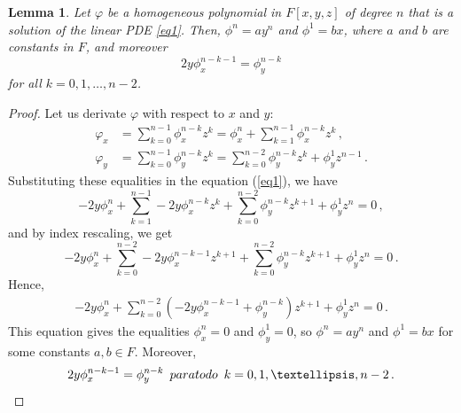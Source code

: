 \documentclass{amsart}
\newtheorem{lem}{Lemma}
\begin{document}
\begin{lem}\label{psedp}
	Let $\varphi$ be a homogeneous polynomial in $F[x,y,z]$ of degree $n$ that is a solution of the linear PDE \eqref{eq1}. Then, $\phi^{n}=ay^{n}$ and $\phi^{1}=bx$, where $a$ and $b$ are constants in $F$, and moreover
	$$2y\phi^{n-k-1}_x=\phi^{n-k}_y$$
	for all $k=0,1,\dots, n-2$.
\end{lem}
\begin{proof}
	Let us derivate $\varphi$ with respect to $x$ and  $y$:
	\begin{align*}
		\varphi_x&=\sum_{k=0}^{n-1}\phi^{n-k}_xz^k=\phi_x^{n}+\sum_{k=1}^{n-1}\phi^{n-k}_xz^k\,,\\
		\varphi_y&=\sum_{k=0}^{n-1}\phi^{n-k}_yz^k=\sum_{k=0}^{n-2}\phi^{n-k}_yz^k+\phi^1_y z^{n-1}\,.
	\end{align*}
	Substituting these equalities in the equation (\ref{eq1}), we have
	$$
	-2y\phi_x^{n}+\sum_{k=1}^{n-1}-2y\phi^{n-k}_xz^k+\sum_{k=0}^{n-2}\phi^{n-k}_yz^{k+1}+\phi^1_y z^{n}=0\,,$$
	and by index rescaling, we get
	$$
	-2y\phi_x^{n}+\sum_{k=0}^{n-2}-2y\phi^{n-k-1}_xz^{k+1}+\sum_{k=0}^{n-2}\phi^{n-k}_yz^{k+1}+\phi^1_y z^{n}=0\,.$$
	Hence,
	\begin{align*}
		-2y\phi_x^{n}+\sum_{k=0}^{n-2}\left(-2y\phi^{n-k-1}_x+\phi^{n-k}_y\right)z^{k+1}+\phi^1_y z^{n}=0\,.\label{eqp5}
	\end{align*}
	This equation gives the equalities $\phi^{n}_x=0$ and $\phi^{1}_y=0$, so $\phi^{n}=ay^{n}$ and $\phi^{1}=bx$ for some constants $a,b\in F$.
	Moreover,
	\begin{equation}
		2y\phi^{n-k-1}_x=\phi^{n-k}_y\,\,\, \textnormal{para todo}\,\,\, k=0,1,\dots, n-2\,.\label{eq5}
	\end{equation}
\end{proof}
\end{document}
